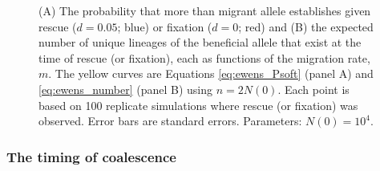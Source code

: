 \documentclass[]{article}
\begin{document}
\begin{figure}[htb]
\centering
{}
\caption{
(A) The probability that more than migrant allele establishes given rescue ($d=0.05$; blue) or fixation ($d=0$; red) and (B) the expected number of unique lineages of the beneficial allele that exist at the time of rescue (or fixation), each as functions of the migration rate, $m$.
The yellow curves are Equations \ref{eq:ewens_Psoft} (panel A) and \ref{eq:ewens_number} (panel B) using $n=2N(0)$.
Each point is based on 100 replicate simulations where rescue (or fixation) was observed.
Error bars are standard errors.
Parameters: $N(0)=10^4$.
}%
\label{fig:PsoftMIG}
\end{figure}

\subsubsection*{The timing of coalescence}
\end{document}

